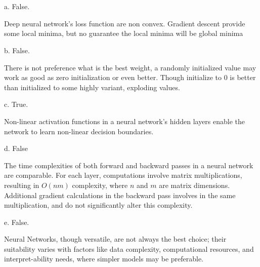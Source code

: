 
    \section{}
    
    \indent\indent a. 
    False.
    
    Deep neural network's loss function are non convex. Gradient descent provide some local minima, but no guarantee the local minima will be global minima
    
    \vspace{1em}
    b. False.
    
    There is not preference what is the best weight, a randomly initialized value may work as good as zero initialization or even better. Though initialize to 0 is better than initialized to some highly variant, exploding values.
    
    \vspace{1em}
    c. True. 
    
    Non-linear activation functions in a neural network's hidden layers enable the network to learn non-linear decision boundaries.
    
    \vspace{1em}
    d. False
    
    The time complexities of both forward and backward passes in a neural network are comparable. For each layer, computations involve matrix multiplications, resulting in \(O(nm)\) complexity, where \(n\) and \(m\) are matrix dimensions. Additional gradient calculations in the backward pass involves in the same multiplication, and do not significantly alter this complexity.
    
    
    \vspace{1em}
    e. False. 
    
    Neural Networks, though versatile, are not always the best choice; their suitability varies with factors like data complexity, computational resources, and interpret-ability needs, where simpler models may be preferable.
    